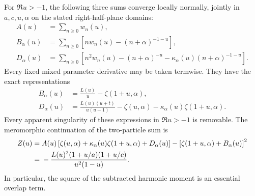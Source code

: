 \begin{theorem}
\label{res:thm:normal}
For $\Re u>-1$, the following three sums converge locally normally,
jointly in $a,c,u,\alpha$ on the stated right-half-plane domains:
\begin{align}
 A(u)&=\sum_{n\geq0}w_n(u),\label{res:eq:A}\\
 B_\alpha(u)&=\sum_{n\geq0}
    \left[nw_n(u)-(n+\alpha)^{-1-u}\right],\label{res:eq:B}\\
 D_\alpha(u)&=\sum_{n\geq0}\left[n^2w_n(u)
    -(n+\alpha)^{-u}
    -\kappa_\alpha(u)(n+\alpha)^{-1-u}\right].\label{res:eq:D}
\end{align}
Every fixed mixed parameter derivative may be taken termwise.  They
have the exact representations
\begin{align}
 B_\alpha(u)&=\frac{L(u)}u-\zeta(1+u,\alpha),\label{res:eq:Bexact}\\
 D_\alpha(u)&=\frac{L(u)(u+t)}{u(u-1)}
    -\zeta(u,\alpha)
    -\kappa_\alpha(u)\zeta(1+u,\alpha).\label{res:eq:Dexact}
\end{align}
Every apparent singularity of these expressions in $\Re u>-1$ is
removable.  The meromorphic continuation of the two-particle sum is
\begin{align}
 Z(u)={}&A(u)\left[\zeta(u,\alpha)
       +\kappa_\alpha(u)\zeta(1+u,\alpha)+D_\alpha(u)\right]
       -\left[\zeta(1+u,\alpha)+B_\alpha(u)\right]^2\notag\\
 ={}&-\frac{L(u)^2(1+u/a)(1+u/c)}{u^2(1-u)}.
 \label{res:eq:Z}
\end{align}
In particular, the square of the subtracted harmonic moment is an
essential overlap term.
\end{theorem}

